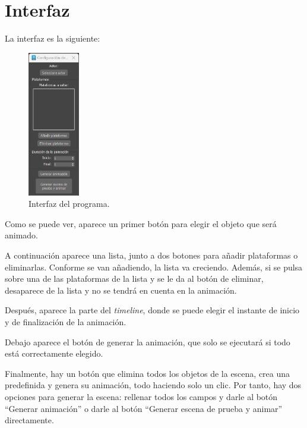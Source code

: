 \section{Interfaz}

La interfaz es la siguiente:

\begin{figure}[H]
   \centering
   \includegraphics[width=0.2\textwidth]{imagenes/ui1.png}
   \caption{Interfaz del programa.}
\end{figure}

Como se puede ver, aparece un primer botón para elegir el objeto que será animado.

\bigskip

A continuación aparece una lista, junto a dos botones para añadir plataformas o eliminarlas. Conforme se van añadiendo, la lista va creciendo. Además, si se pulsa sobre una de las plataformas de la lista y se le da al botón de eliminar, desaparece de la lista y no se tendrá en cuenta en la animación.

\bigskip

Después, aparece la parte del \textit{timeline}, donde se puede elegir el instante de inicio y de finalización de la animación.

\bigskip

Debajo aparece el botón de generar la animación, que solo se ejecutará si todo está correctamente elegido.

\bigskip

Finalmente, hay un botón que elimina todos los objetos de la escena, crea una predefinida y genera su animación, todo haciendo solo un clic. Por tanto, hay dos opciones para generar la escena: rellenar todos los campos y darle al botón ``Generar animación'' o darle al botón ``Generar escena de prueba y animar'' directamente.

